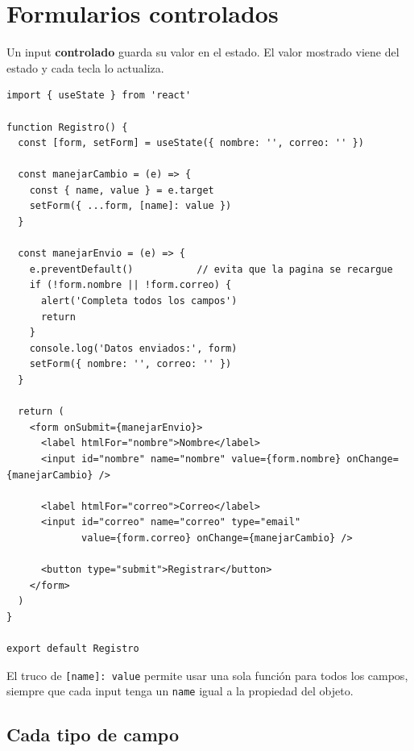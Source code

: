 \documentclass[11pt,a4paper]{article}
\newcommand{\cmd}[1]{\texttt{\color{reactdark}#1}}
\begin{document}
\section{Formularios controlados}\label{sec:formularios}

Un input \textbf{controlado} guarda su valor en el estado. El valor mostrado viene del estado y cada tecla lo actualiza.

\begin{lstlisting}[language=JSX,title={\small\ttfamily src/components/Registro.jsx}]
import { useState } from 'react'

function Registro() {
  const [form, setForm] = useState({ nombre: '', correo: '' })

  const manejarCambio = (e) => {
    const { name, value } = e.target
    setForm({ ...form, [name]: value })
  }

  const manejarEnvio = (e) => {
    e.preventDefault()           // evita que la pagina se recargue
    if (!form.nombre || !form.correo) {
      alert('Completa todos los campos')
      return
    }
    console.log('Datos enviados:', form)
    setForm({ nombre: '', correo: '' })
  }

  return (
    <form onSubmit={manejarEnvio}>
      <label htmlFor="nombre">Nombre</label>
      <input id="nombre" name="nombre" value={form.nombre} onChange={manejarCambio} />

      <label htmlFor="correo">Correo</label>
      <input id="correo" name="correo" type="email"
             value={form.correo} onChange={manejarCambio} />

      <button type="submit">Registrar</button>
    </form>
  )
}

export default Registro
\end{lstlisting}

El truco de \cmd{[name]: value} permite usar una sola función para todos los campos, siempre que cada input tenga un \cmd{name} igual a la propiedad del objeto.

\subsection{Cada tipo de campo}
\end{document}
